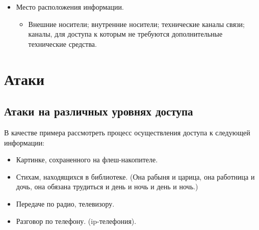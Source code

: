 \begin{frame}[allowframebreaks]
\begin{itemize}
    \item Место расположения информации.
    \begin{itemize}
        \item Внешние носители; внутренние носители; технические каналы связи; каналы, для доступа к которым не требуются дополнительные технические средства.
    \end{itemize}
\end{itemize}
\end{frame}


\section{Атаки}


\subsection{Атаки на различных уровнях доступа}

В качестве примера рассмотреть процесс осуществления доступа к следующей информации:
\begin{itemize}
    \item Картинке, сохраненного на флеш-накопителе.
    \item Стихам, находящихся в библиотеке. (Она рабыня и царица, она работница и дочь, она обязана трудиться и день и ночь и день и ночь.)
    \item Передаче по радио, телевизору.
    \item Разговор по телефону. (ip-телефония).
\end{itemize}


